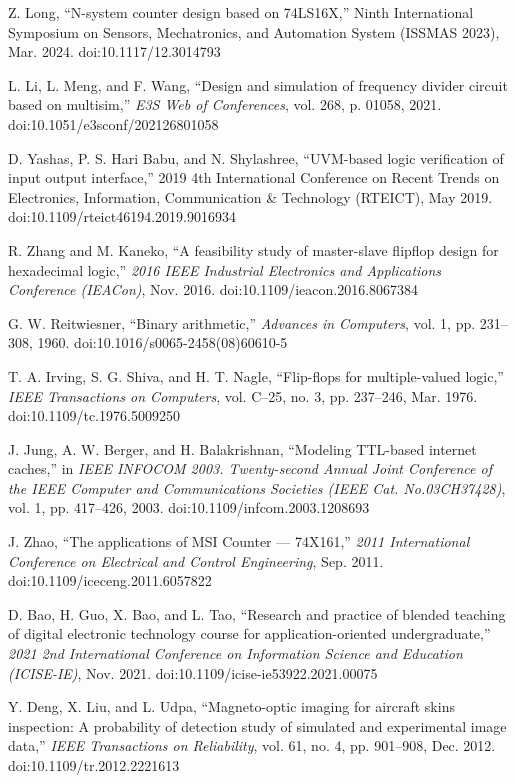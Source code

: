 \documentclass[conference]{IEEEtran}
\begin{document}

\begin{thebibliography}{1}

Z. Long, “N-system counter design based on 74LS16X,” Ninth International Symposium on Sensors, Mechatronics, and Automation System (ISSMAS 2023), Mar. 2024. doi:10.1117/12.3014793

L. Li, L. Meng, and F. Wang, “Design and simulation of frequency divider circuit based on multisim,” \textit{E3S Web of Conferences}, vol. 268, p. 01058, 2021. doi:10.1051/e3sconf/202126801058

D. Yashas, P. S. Hari Babu, and N. Shylashree, “UVM-based logic verification of input output interface,” 2019 4th International Conference on Recent Trends on Electronics, Information, Communication \& Technology (RTEICT), May 2019. doi:10.1109/rteict46194.2019.9016934

R. Zhang and M. Kaneko, “A feasibility study of master-slave flipflop design for hexadecimal logic,” \textit{2016 IEEE Industrial Electronics and Applications Conference (IEACon)}, Nov. 2016. doi:10.1109/ieacon.2016.8067384

G. W. Reitwiesner, “Binary arithmetic,” \textit{Advances in Computers}, vol. 1, pp. 231–308, 1960. doi:10.1016/s0065-2458(08)60610-5

T. A. Irving, S. G. Shiva, and H. T. Nagle, “Flip-flops for multiple-valued logic,” \textit{IEEE Transactions on Computers}, vol. C–25, no. 3, pp. 237–246, Mar. 1976. doi:10.1109/tc.1976.5009250

J. Jung, A. W. Berger, and H. Balakrishnan, “Modeling TTL-based internet caches,” in \textit{IEEE INFOCOM 2003. Twenty-second Annual Joint Conference of the IEEE Computer and Communications Societies (IEEE Cat. No.03CH37428)}, vol. 1, pp. 417–426, 2003. doi:10.1109/infcom.2003.1208693

J. Zhao, “The applications of MSI Counter — 74X161,” \textit{2011 International Conference on Electrical and Control Engineering}, Sep. 2011. doi:10.1109/iceceng.2011.6057822

D. Bao, H. Guo, X. Bao, and L. Tao, “Research and practice of blended teaching of digital electronic technology course for application-oriented undergraduate,” \textit{2021 2nd International Conference on Information Science and Education (ICISE-IE)}, Nov. 2021. doi:10.1109/icise-ie53922.2021.00075

Y. Deng, X. Liu, and L. Udpa, “Magneto-optic imaging for aircraft skins inspection: A probability of detection study of simulated and experimental image data,” \textit{IEEE Transactions on Reliability}, vol. 61, no. 4, pp. 901–908, Dec. 2012. doi:10.1109/tr.2012.2221613

\end{thebibliography}
\end{document}
